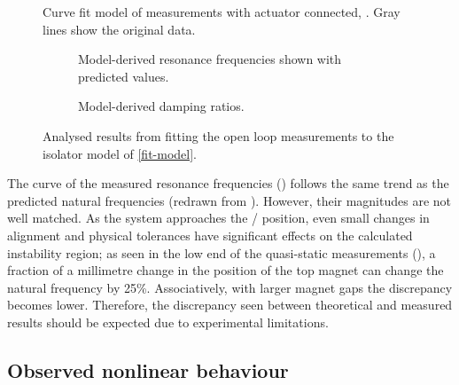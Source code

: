 \documentclass[11pt,a4paper]{memoir}
\begin{document}
\begin{figure}[p]
  \caption[Curve fit model of measurements with actuator connected]{Curve fit model of measurements with actuator connected, . Gray lines show the original data.}
\end{figure}

\begin{figure}
  \begin{wide}
  \begin{subfigure}
    \caption{Model-derived resonance frequencies shown with predicted values.}
  \end{subfigure}
  \hfil
  \begin{subfigure}
    \caption{Model-derived damping ratios.}
  \end{subfigure}
  \end{wide}
  \caption{Analysed results from fitting the open loop measurements to the isolator model of \eqref{fit-model}.}
\end{figure}

The curve of the measured resonance frequencies () follows the same trend as the predicted natural frequencies (redrawn from ).
However, their magnitudes are not well matched.
As the system approaches the \qzs/ position, even small changes in alignment and physical tolerances have significant effects on the calculated instability region; as seen in the low end of the quasi-static measurements (), a fraction of a millimetre change in the position of the top magnet can change the natural frequency by 25\%.
Associatively, with larger magnet gaps the discrepancy becomes lower.
Therefore, the discrepancy seen between theoretical and measured results should be expected due to experimental limitations.


\subsection{Observed nonlinear behaviour}
\end{document}
